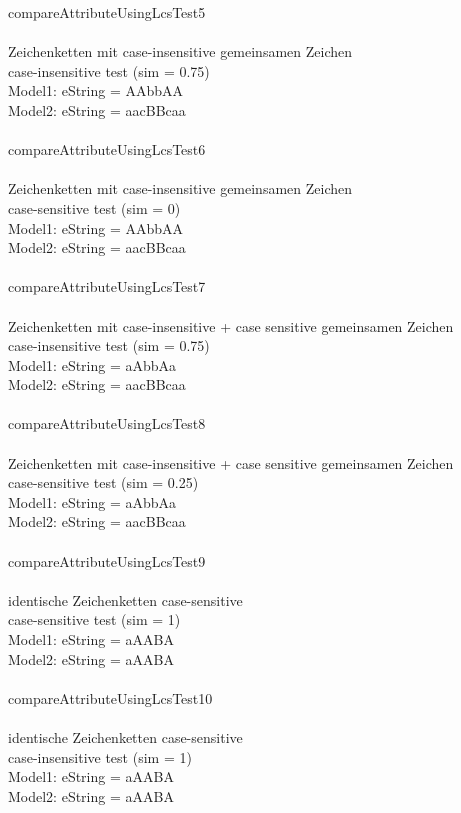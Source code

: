 compareAttributeUsingLcsTest5\\\\
Zeichenketten mit case-insensitive gemeinsamen Zeichen\\
case-insensitive test (sim = 0.75)\\
Model1: eString = AAbbAA\\
Model2: eString = aacBBcaa\\\\

compareAttributeUsingLcsTest6\\\\
Zeichenketten mit case-insensitive gemeinsamen Zeichen\\
case-sensitive test (sim = 0)\\
Model1: eString = AAbbAA\\
Model2: eString = aacBBcaa\\\\

compareAttributeUsingLcsTest7\\\\
Zeichenketten mit case-insensitive + case sensitive gemeinsamen Zeichen\\
case-insensitive test (sim = 0.75)\\
Model1: eString = aAbbAa\\
Model2: eString = aacBBcaa\\\\

compareAttributeUsingLcsTest8\\\\
Zeichenketten mit case-insensitive + case sensitive gemeinsamen Zeichen\\
case-sensitive test (sim = 0.25)\\
Model1: eString = aAbbAa\\
Model2: eString = aacBBcaa\\\\

compareAttributeUsingLcsTest9\\\\
identische Zeichenketten case-sensitive\\
case-sensitive test (sim = 1)\\
Model1: eString = aAABA\\
Model2: eString = aAABA\\\\

compareAttributeUsingLcsTest10\\\\
identische Zeichenketten case-sensitive\\
case-insensitive test (sim = 1)\\
Model1: eString = aAABA\\
Model2: eString = aAABA\\\\


